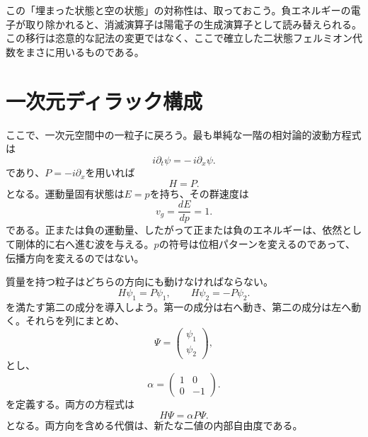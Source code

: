 この「埋まった状態と空の状態」の対称性は、取っておこう。負エネルギーの電子が取り除かれると、消滅演算子は陽電子の生成演算子として読み替えられる。この移行は恣意的な記法の変更ではなく、ここで確立した二状態フェルミオン代数をまさに用いるものである。

\section{一次元ディラック構成}

ここで、一次元空間中の一粒子に戻ろう。最も単純な一階の相対論的波動方程式は
\begin{equation}
i\partial_t\psi=-\,i\partial_x\psi.
\label{eq:l10-right-mover}
\end{equation}
であり、\(P=-i\partial_x\)を用いれば
\begin{equation}
H=P.
\end{equation}
となる。運動量固有状態は\(E=p\)を持ち、その群速度は
\begin{equation}
v_g=\frac{dE}{dp}=1.
\end{equation}
である。正または負の運動量、したがって正または負のエネルギーは、依然として剛体的に右へ進む波を与える。\(p\)の符号は位相パターンを変えるのであって、伝播方向を変えるのではない。

質量を持つ粒子はどちらの方向にも動けなければならない。
\begin{equation}
H\psi_1=P\psi_1,
\qquad
H\psi_2=-P\psi_2.
\label{eq:l10-two-directions}
\end{equation}
を満たす第二の成分を導入しよう。第一の成分は右へ動き、第二の成分は左へ動く。それらを列にまとめ、
\begin{equation}
\Psi=
\begin{pmatrix}
\psi_1\\
\psi_2
\end{pmatrix},
\end{equation}
とし、
\begin{equation}
\alpha=
\begin{pmatrix}
1&0\\
0&-1
\end{pmatrix}.
\end{equation}
を定義する。両方の方程式は
\begin{equation}
H\Psi=\alpha P\Psi.
\label{eq:l10-massless-one-d}
\end{equation}
となる。両方向を含める代償は、新たな二値の内部自由度である。

